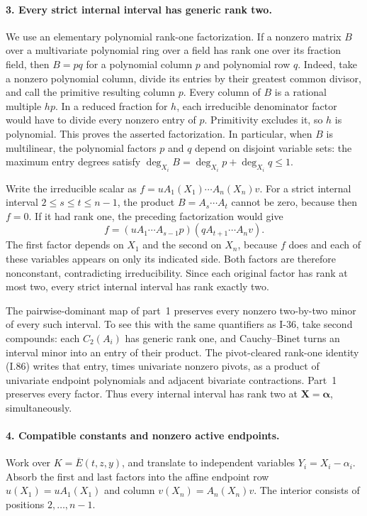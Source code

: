 \paragraph{3. Every strict internal interval has generic rank two.}
We use an elementary polynomial rank-one factorization. If a
nonzero matrix $B$ over a multivariate polynomial ring over a
field has rank one over its fraction field, then $B=pq$ for a
polynomial column $p$ and polynomial row $q$. Indeed, take a
nonzero polynomial column, divide its entries by their greatest
common divisor, and call the primitive resulting column $p$.
Every column of $B$ is a rational multiple $h p$. In a reduced
fraction for $h$, each irreducible denominator factor would have
to divide every nonzero entry of $p$. Primitivity excludes it,
so $h$ is polynomial. This proves the asserted factorization.
In particular, when $B$ is multilinear, the polynomial factors
$p$ and $q$ depend on disjoint variable sets: the maximum entry
degrees satisfy
$\deg_{X_i}B=\deg_{X_i}p+\deg_{X_i}q\le1$.

Write the irreducible scalar as
$f=u A_1(X_1)\cdots A_n(X_n)v$. For a strict internal interval
$2\le s\le t\le n-1$, the product $B=A_s\cdots A_t$ cannot
be zero, because then $f=0$. If it had rank one, the preceding
factorization would give
\[
 f=(uA_1\cdots A_{s-1}p)(qA_{t+1}\cdots A_nv).
 \tag{I.94}
\]
The first factor depends on $X_1$ and the second on $X_n$,
because $f$ does and each of these variables appears on only
its indicated side. Both factors are therefore nonconstant,
contradicting irreducibility. Since each original factor has
rank at most two, every strict internal interval has rank
exactly two.

The pairwise-dominant map of part~1 preserves every nonzero
two-by-two minor of every such interval. To see this with the
same quantifiers as I-36, take second compounds: each
$C_2(A_i)$ has generic rank one, and Cauchy--Binet turns an
interval minor into an entry of their product. The pivot-cleared
rank-one identity (I.86) writes that entry, times univariate
nonzero pivots, as a product of univariate endpoint polynomials
and adjacent bivariate contractions. Part~1 preserves every
factor. Thus every internal interval has rank two at
$\mathbf X=\boldsymbol\alpha$, simultaneously.

\paragraph{4. Compatible constants and nonzero active endpoints.}
Work over $K=\overline E(t,z,y)$, and translate to independent
variables $Y_i=X_i-\alpha_i$. Absorb the first and last factors
into the affine endpoint row $u(X_1)=uA_1(X_1)$ and column
$v(X_n)=A_n(X_n)v$. The interior consists of positions
$2,\ldots,n-1$.


